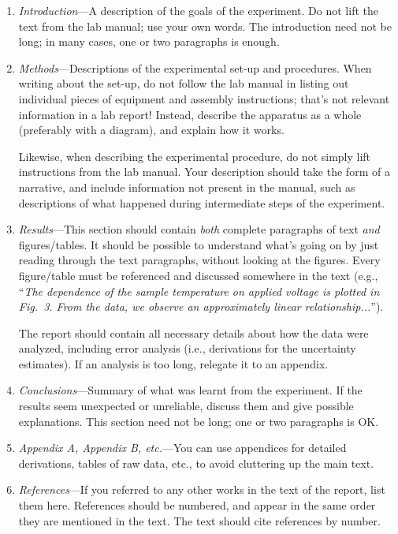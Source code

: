 \documentclass[11pt,a4paper]{article}
\begin{document}
\begin{enumerate}
\item \textit{Introduction}---A description of the goals of the
  experiment.  Do not lift the text from the lab manual; use your own
  words.  The introduction need not be long; in many cases, one or two
  paragraphs is enough.

\item \textit{Methods}---Descriptions of the experimental set-up and
  procedures.  When writing about the set-up, do not follow the lab
  manual in listing out individual pieces of equipment and assembly
  instructions; that's not relevant information in a lab report!
  Instead, describe the apparatus as a whole (preferably with a
  diagram), and explain how it works.

  Likewise, when describing the experimental procedure, do not simply
  lift instructions from the lab manual.  Your description should take
  the form of a narrative, and include information not present in the
  manual, such as descriptions of what happened during intermediate
  steps of the experiment.

\item \textit{Results}---This section should contain \textit{both}
  complete paragraphs of text \textit{and} figures/tables.  It should
  be possible to understand what's going on by just reading through
  the text paragraphs, without looking at the figures.  Every
  figure/table must be referenced and discussed somewhere in the text
  (e.g., ``\textit{The dependence of the sample temperature on applied
    voltage is plotted in Fig.~3.  From the data, we observe an
    approximately linear relationship...}'').

  The report should contain all necessary details about how the data
  were analyzed, including error analysis (i.e., derivations for the
  uncertainty estimates).  If an analysis is too long, relegate it to
  an appendix.

\item \textit{Conclusions}---Summary of what was learnt from the
  experiment.  If the results seem unexpected or unreliable, discuss
  them and give possible explanations.  This section need not be long;
  one or two paragraphs is OK.

\item \textit{Appendix A, Appendix B, etc.}---You can use appendices
  for detailed derivations, tables of raw data, etc., to avoid
  cluttering up the main text.

\item \textit{References}---If you referred to any other works in the
  text of the report, list them here.  References should be numbered,
  and appear in the same order they are mentioned in the text.  The
  text should cite references by number.
\end{enumerate}
\end{document}
